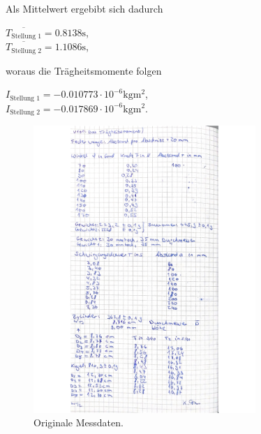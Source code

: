 Als Mittelwert ergebibt sich dadurch
\begin{center}
  $\overline{T_{\text{Stellung 1}}} = 0.8138 \si{\second}$, \\
  $\overline{T_{\text{Stellung 2}}} = 1.1086 \si{\second}$, \\
\end{center}


woraus die Trägheitsmomente folgen %
\begin{center}
  $I_{\text{Stellung 1}} = -0.010773 \cdot 10^{-6} \si{\kilogram\meter^2}$, \\
  $I_{\text{Stellung 2}} = -0.017869 \cdot 10^{-6} \si{\kilogram\meter^2}$. \\
\end{center}



\newpage

\begin{figure}[H]
  \centering
  \includegraphics[width=0.75\textwidth]{Bilder/daten1.jpg}
  \caption{Originale Messdaten.}
  \label{fig:daten1}
\end{figure}

